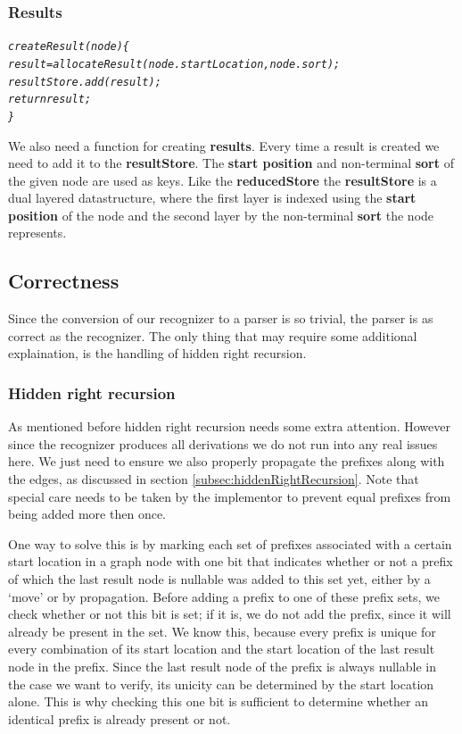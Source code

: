 \documentclass[a4paper,10pt]{article}
\begin{document}
\pagebreak
\subsubsection{Results}
{\small
\begin{alltt}
\textit{createResult(node)\{
  result = allocateResult(node.startLocation, node.sort);
  resultStore.add(result);
  return result;
\}}
\end{alltt}
}

We also need a function for creating {\bf results}. Every time a result is created we need to add it to the {\bf resultStore}. The {\bf start position} and non-terminal {\bf sort} of the given node are used as keys. Like the {\bf reducedStore} the {\bf resultStore} is a dual layered datastructure, where the first layer is indexed using the {\bf start position} of the node and the second layer by the non-terminal {\bf sort} the node represents.

\subsection{Correctness}
\label{sec:parserCorrectness}

Since the conversion of our recognizer to a parser is so trivial, the parser is as correct as the recognizer. The only thing that may require some additional explaination, is the handling of hidden right recursion.

\subsubsection{Hidden right recursion}
As mentioned before hidden right recursion needs some extra attention. However since the recognizer produces all derivations we do not run into any real issues here. We just need to ensure we also properly propagate the prefixes along with the edges, as discussed in section \ref{subsec:hiddenRightRecursion}. Note that special care needs to be taken by the implementor to prevent equal prefixes from being added more then once.

One way to solve this is by marking each set of prefixes associated with a certain start location in a graph node with one bit that indicates whether or not a prefix of which the last result node is nullable was added to this set yet, either by a `move' or by propagation. Before adding a prefix to one of these prefix sets, we check whether or not this bit is set; if it is, we do not add the prefix, since it will already be present in the set. We know this, because every prefix is unique for every combination of its start location and the start location of the last result node in the prefix. Since the last result node of the prefix is always nullable in the case we want to verify, its unicity can be determined by the start location alone. This is why checking this one bit is sufficient to determine whether an identical prefix is already present or not.
\end{document}
